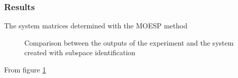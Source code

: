 \subsubsection{Results}

The system matrices determined with the MOESP method 

%     

\begin{figure}[t]
    \centering
    
    \caption{Comparison between the outputs of the experiment and the system created with subspace identification}
    \label{fig:Comp_subID}
\end{figure}

From figure \ref{fig:Comp_subID} 